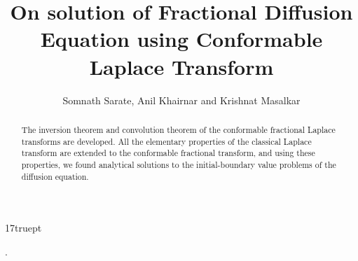 \documentclass[two side,reqno,12pt]{amsart}
\numberwithin{equation}{section}
\theoremstyle{definition}
\begin{document}
	\baselineskip 17truept
	\title{On solution of Fractional Diffusion Equation using Conformable Laplace Transform}
	\date{}
	\author{Somnath Sarate, Anil Khairnar and Krishnat Masalkar} 	
	
	\address{Somanth Sarate , Department~of~Engineering Science and Humanities, Marathwada~Mitra~ Mandal~College~of engineering, Karve~nagar, Pune, Pune-41004, India
		(M.S.)} 
	
	\address{Anil Khairnar, Department~of~Mathematics, Abasaheb~Garware~College~~Pune-411004~Pune, Pune-411007, India
		(M.S.)} 
	\address{Krishnat Masalkar, Department~of~Mathematics, Abasaheb~Garware~College~~Pune-411004~Pune, Pune-411007, India
		(M.S.)} 
	\makeatletter
	\makeatother
	
	
	\maketitle 
	
	\maketitle 
	\begin{abstract}
The inversion theorem and convolution theorem of the conformable fractional Laplace transforms are developed. All the elementary properties of the classical Laplace transform are extended to the conformable fractional transform, and using these properties, we found analytical solutions to the initial-boundary value problems of the diffusion equation.
	\end{abstract}
	
	  .\\
\end{document}
